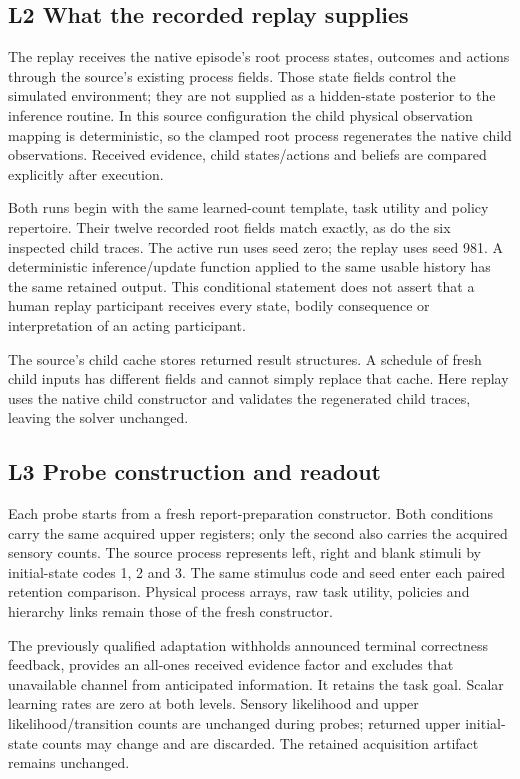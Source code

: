 \documentclass[
  american,
  11pt,
  letterpaper,
]{article}
\begin{document}
\subsection{L2 What the recorded replay supplies}\label{l2-what-the-recorded-replay-supplies}

The replay receives the native episode's root process states, outcomes and actions through the source's existing process fields. Those state fields control the simulated environment; they are not supplied as a hidden-state posterior to the inference routine. In this source configuration the child physical observation mapping is deterministic, so the clamped root process regenerates the native child observations. Received evidence, child states/actions and beliefs are compared explicitly after execution.

Both runs begin with the same learned-count template, task utility and policy repertoire. Their twelve recorded root fields match exactly, as do the six inspected child traces. The active run uses seed zero; the replay uses seed 981. A deterministic inference/update function applied to the same usable history has the same retained output. This conditional statement does not assert that a human replay participant receives every state, bodily consequence or interpretation of an acting participant.

The source's child cache stores returned result structures. A schedule of fresh child inputs has different fields and cannot simply replace that cache. Here replay uses the native child constructor and validates the regenerated child traces, leaving the solver unchanged.

\subsection{L3 Probe construction and readout}\label{l3-probe-construction-and-readout}

Each probe starts from a fresh report-preparation constructor. Both conditions carry the same acquired upper registers; only the second also carries the acquired sensory counts. The source process represents left, right and blank stimuli by initial-state codes 1, 2 and 3. The same stimulus code and seed enter each paired retention comparison. Physical process arrays, raw task utility, policies and hierarchy links remain those of the fresh constructor.

The previously qualified adaptation withholds announced terminal correctness feedback, provides an all-ones received evidence factor and excludes that unavailable channel from anticipated information. It retains the task goal. Scalar learning rates are zero at both levels. Sensory likelihood and upper likelihood/transition counts are unchanged during probes; returned upper initial-state counts may change and are discarded. The retained acquisition artifact remains unchanged.
\end{document}
